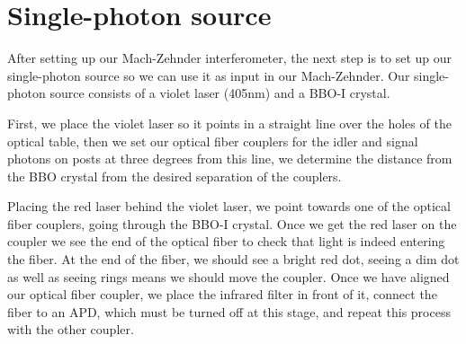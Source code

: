 \documentclass[12pt]{book}
\begin{document}
 





\section{Single-photon source}

After setting up our Mach-Zehnder interferometer, the next step is to set up our single-photon source so we can use it as input in our Mach-Zehnder. Our single-photon source consists of a violet laser (405nm) and a BBO-I crystal.




First, we place the violet laser so it points in a straight line over the holes of the optical table, then we set our optical fiber couplers for the idler and signal photons on posts at three degrees from this line, we determine the distance from the BBO crystal from the desired separation of the couplers.

Placing the red laser behind the violet laser, we point towards one of the optical fiber couplers, going through the BBO-I crystal. Once we get the red laser on the coupler we see the end of the optical fiber to check that light is indeed entering the fiber. At the end of the fiber, we should see a bright red dot, seeing a dim dot as well as seeing rings means we should move the coupler. Once we have aligned our optical fiber coupler, we place the infrared filter in front of it, connect the fiber to an APD, which must be turned off at this stage, and repeat this process with the other coupler.
\end{document}
